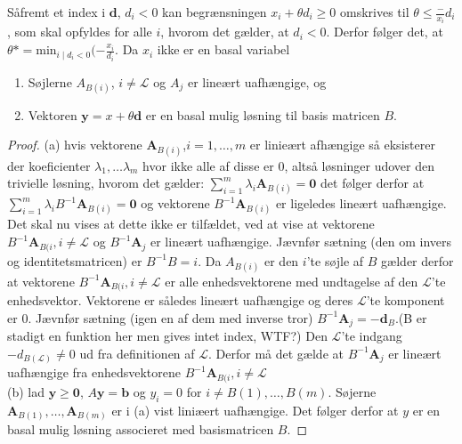 Såfremt et index i $\mathbf{d}$, $d_i<0$ kan begrænsningen $x_i + \theta d_i \geq 0$ omskrives til $\theta \leq \frac-{x_i}{d_i}$, som skal opfyldes for alle $i$, hvorom det gælder, at $d_i<0$.
Derfor følger det, at $\theta*=\text{min}_{i \mid d_i<0}(-\frac{x_i}{d_i}$.
Da $x_i$ ikke er en basal variabel 
% 
\begin{thm}{}{}
\begin{enumerate}[label = (\alph*)]
\item Søjlerne $A_{B(i)}$, $i \neq \mathcal{L}$ og $A_j$ er lineært uafhængige, og 
\item Vektoren $\mathbf{y}=x+ \theta \mathbf{d}$ er en basal mulig løsning til basis matricen $B$. %
\end{enumerate}
\end{thm}
%
\begin{proof}
(a) hvis vektorene $\mathbf{A}_{B(i)}$,$i=1,\ldots,m$ er linieært afhængige så eksisterer der koeficienter $\lambda_1,\ldots \lambda_m$ hvor ikke alle af disse er $0$, altså løsninger udover den trivielle løsning, hvorom det gælder:
$ \sum_{i=1}^m \lambda_i \mathbf{A}_{B(i)}=\mathbf{0} $ det følger derfor at $\sum_{i=1}^m \lambda_i B^{-1}\mathbf{A}_{B(i)}=\mathbf{0}$ og vektorene $B^{-1}\mathbf{A}_{B(i)}$ er ligeledes lineært uafhængige. Det skal nu vises at dette ikke er tilfældet, ved at vise at vektorene $B^{-1}\mathbf{A}_{B(i},i\neq \mathcal{L}$ og $B^{-1}\mathbf{A}_j$ er lineært uafhængige.
Jævnfør sætning (den om invers og identitetsmatricen) er $B^{-1}B=i$.
Da $A_{B(i)}$ er den $i$'te søjle af $B$ gælder derfor at vektorene $B^{-1}\mathbf{A}_{B(i},i\neq \mathcal{L}$  er alle enhedsvektorene med undtagelse af den $\mathcal{L}$'te enhedsvektor. 
Vektorene er således lineært uafhængige og deres  $\mathcal{L}$'te komponent er $0$.
Jævnfør sætning (igen en af dem med inverse tror) $B^{-1}\mathbf{A}_j=-\mathbf{d}_B$.(B er stadigt en funktion her men gives intet index, WTF?) 
Den $\mathcal{L}$'te indgang $-d_{B(\mathcal{L})}\neq 0$ ud fra definitionen af $\mathcal{L}$.
Derfor må det gælde at $B^{-1} \mathbf{A}_j$ er lineært uafhængige fra enhedsvektorene $B^{-1}\mathbf{A}_{B(i},i\neq \mathcal{L}$ \\
(b) lad $\mathbf{y}\geq \mathbf{0}$, $A\mathbf{y}=\mathbf{b}$ og $y_i=0$ for $i \neq B(1),\ldots,B(m)$. Søjerne $\mathbf{A}_{B(1)},\ldots,\mathbf{A}_{B(m)}$ er i (a) vist liniæert uafhængige. Det følger derfor at $y$ er en basal mulig løsning associeret med basismatricen $B$.
\end{proof}
\\
%

